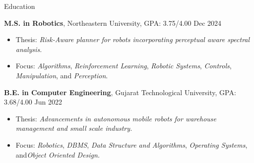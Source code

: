 \documentclass{resume}
\newcommand{\smallspace}{\hspace{0.2em}}
\begin{document}
\fancyheadoffset[RO]{5em}
\fancyfootoffset[RO]{0cm}
\thispagestyle{firstpage}
\vspace{-10pt}
\begin{rSection}{Education}


{\textbf {M.S. in Robotics}}, Northeastern University, GPA: 3.75/4.00 \hfill {Dec 2024} 
 
\begin{itemize}
  \item[] \vspace{-0.5em} \hspace{-1.0em} Thesis: \emph{Risk-Aware planner for robots incorporating perceptual aware spectral analysis.}
  \item[] \vspace{-0.5em} \hspace{-1.0em} Focus: \emph{Algorithms}, \smallspace \emph{Reinforcement Learning}, \smallspace \emph{Robotic Systems}, \smallspace \emph{Controls}, \smallspace \emph{Manipulation}, \smallspace and \smallspace \emph{Perception}.
\end{itemize}


{\bf B.E. in Computer Engineering}, Gujarat Technological University, GPA: 3.68/4.00 \hfill {Jun 2022} 
\begin{itemize}
    \item[] \vspace{-0.5em} \hspace{-1.0em} Thesis: \emph{Advancements in autonomous mobile robots for warehouse management and small scale industry.}
    \item[] \vspace{-0.5em} \hspace{-1.0em} Focus: \emph{Robotics}, \smallspace \emph{DBMS}, \smallspace \emph{Data Structure and Algorithms}, \smallspace \emph{Operating Systems}, \smallspace and\smallspace \emph{Object Oriented Design.}
\end{itemize}
\end{rSection}
\vspace{-3mm}
\end{document}

